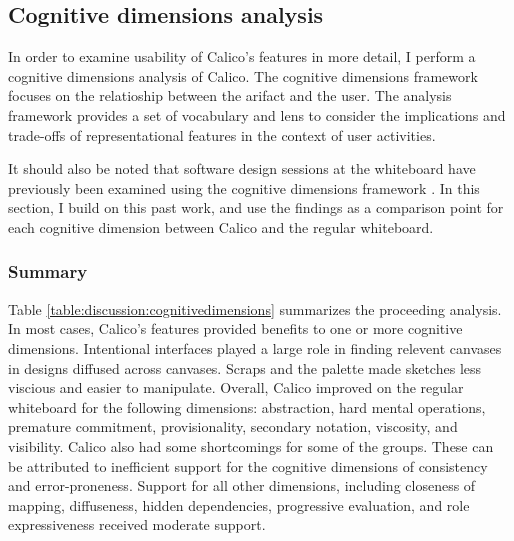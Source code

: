 \documentclass[12pt,fleqn]{ucithesis}
\begin{document}
\subsection{Cognitive dimensions analysis}



In order to examine usability of Calico's features in more detail, I perform a cognitive dimensions analysis \cite{Green96usabilityanalysis} of Calico. The cognitive dimensions framework focuses on the relatioship between the arifact and the user. The analysis framework provides a set of vocabulary and lens to consider the implications and trade-offs of representational features in the context of user activities. 

It should also be noted that software design sessions at the whiteboard have previously been examined using the cognitive dimensions framework \citep{Petre2013BookChapter}. In this section, I build on this past work, and use the findings as a comparison point for each cognitive dimension between Calico and the regular whiteboard.

\subsubsection{Summary}
Table \ref{table:discussion:cognitivedimensions} summarizes the proceeding analysis. In most cases, Calico's features provided benefits to one or more cognitive dimensions. Intentional interfaces played a large role in finding relevent canvases in designs diffused across canvases. Scraps and the palette made sketches less viscious and easier to manipulate. Overall, Calico improved on the regular whiteboard for the following dimensions: abstraction, hard mental operations, premature commitment, provisionality, secondary notation, viscosity, and visibility. Calico also had some shortcomings for some of the groups. These can be attributed to inefficient support for the cognitive dimensions of consistency and error-proneness. Support for all other dimensions, including closeness of mapping, diffuseness, hidden dependencies, progressive evaluation, and role expressiveness received moderate support.
\end{document}
